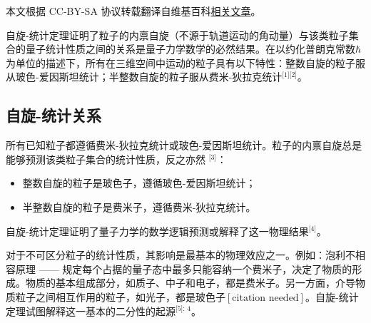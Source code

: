 
本文根据 CC-BY-SA 协议转载翻译自维基百科\href{https://en.wikipedia.org/wiki/Spin\%E2\%80\%93statistics_theorem}{相关文章}。

自旋-统计定理证明了粒子的内禀自旋（不源于轨道运动的角动量）与该类粒子集合的量子统计性质之间的关系是量子力学数学的必然结果。在以约化普朗克常数\( \hbar \)为单位的描述下，所有在三维空间中运动的粒子具有以下特性：整数自旋的粒子服从玻色-爱因斯坦统计；半整数自旋的粒子服从费米-狄拉克统计\(^\text{[1][2]}\)。
\subsection{自旋-统计关系} 
所有已知粒子都遵循费米-狄拉克统计或玻色-爱因斯坦统计。粒子的内禀自旋总是能够预测该类粒子集合的统计性质，反之亦然 \(^\text{[3]}\)：  
\begin{itemize}
\item 整数自旋的粒子是玻色子，遵循玻色-爱因斯坦统计；  
\item 半整数自旋的粒子是费米子，遵循费米-狄拉克统计。  
\end{itemize}
自旋-统计定理证明了量子力学的数学逻辑预测或解释了这一物理结果\(^\text{[4]}\)。  

对于不可区分粒子的统计性质，其影响是最基本的物理效应之一。例如：泡利不相容原理 —— 规定每个占据的量子态中最多只能容纳一个费米子，决定了物质的形成。物质的基本组成部分，如质子、中子和电子，都是费米子。另一方面，介导物质粒子之间相互作用的粒子，如光子，都是玻色子\([\text{citation needed}]\)。自旋-统计定理试图解释这一基本的二分性的起源\(^\text{[5]: 4}\)。

